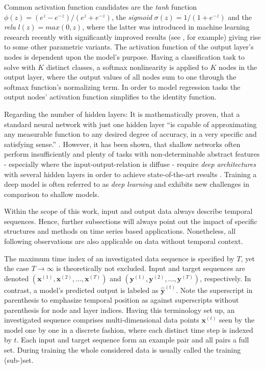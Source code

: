 Common activation function candidates are the \textit{tanh} function $\phi(z)=(e^z - e^{-z})/(e^z+e^{-z})$, the \textit{sigmoid} $\sigma(z) = 1/(1 + e^{-z})$ and the \textit{\gls{relu}} $l(z) = max(0, z)$, where the latter was introduced in machine learning research recently with significantly improved results (see \cite{BeBou2013}, for example) giving rise to some other parametric variants.
The activation function of the output layer's nodes is dependent upon the model's purpose.
Having a classification task to solve with $K$ distinct classes, a softmax nonlinearity is applied to $K$ nodes in the output layer, where the output values of all nodes sum to one through the softmax function's normalizing term.
In order to model regression tasks the output nodes' activation function simplifies to the identity function.

Regarding the number of hidden layers: It is mathematically proven, that a standard neural network with just one hidden layer ``is capable of approximating any measurable function to any desired degree of accuracy, in a very specific and satisfying sense.'' \cite{HoSti1989}.
However, it has been shown, that shallow networks often perform insufficiently and plenty of tasks with non-determinable abstract features - especially where the input-output-relation is diffuse - require \textit{deep architectures} with several hidden layers in order to achieve state-of-the-art results \cite{Bengio2009}. Training a deep model is often referred to as \textit{deep learning} and exhibits new challenges in comparison to shallow models.

Within the scope of this work, input and output data always describe temporal sequences.
Hence, further subsections will always point out the impact of specific structures and methods on time series based applications.
Nonetheless, all following observations are also applicable on data without temporal context.

The maximum time index of an investigated data sequence is specified by $T$, yet the case $T \to \infty$ is theoretically not excluded.
Input and target sequences are denoted $\left(\bm{x}^{(1)}, \bm{x}^{(2)}, \ldots, \bm{x}^{(T)}\right)$ and $\left(\bm{y}^{(1)}, \bm{y}^{(2)}, \ldots, \bm{y}^{(T)}\right)$, respectively.
In contrast, a model's predicted output is labeled as $\bm{\hat{y}}^{(t)}$.
Note the superscript in parenthesis to emphasize temporal position as against superscripts without parenthesis for node and layer indices.
Having this terminology set up, an investigated sequence comprises multi-dimensional data points $\bm{x}^{(t)}$ seen by the model one by one in a discrete fashion, where each distinct time step is indexed by $t$.
Each input and target sequence form an example pair and all pairs a full set.
During training the whole considered data is usually called the training (sub-)set. 

